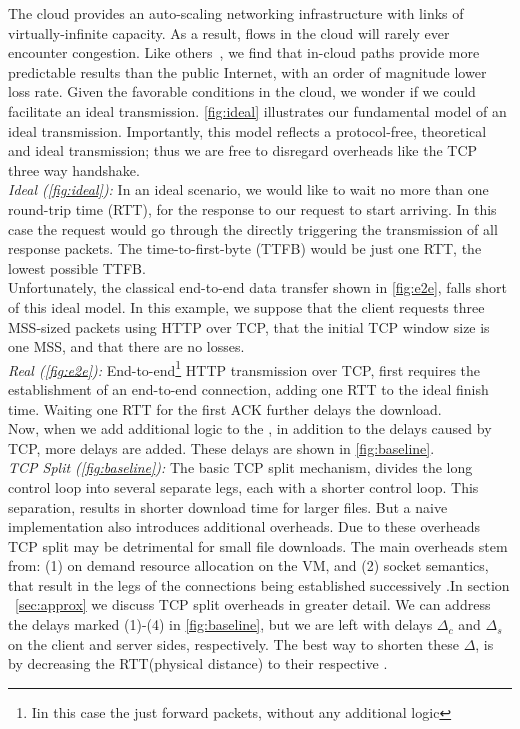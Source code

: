 The cloud provides an auto-scaling networking infrastructure with links of virtually-infinite capacity. As a result, flows in the cloud will rarely ever encounter congestion. Like others~\cite{haq2017measuring}, we find that in-cloud paths provide more predictable results than the public Internet, with an order of magnitude lower loss rate. Given the favorable conditions in the cloud, we wonder if we could facilitate an ideal transmission. \autoref{fig:ideal} illustrates our fundamental model of an ideal transmission. Importantly, this model reflects a protocol-free, theoretical and ideal transmission; thus we are free to disregard overheads like the TCP three way handshake.\\
 \textit{Ideal (\autoref{fig:ideal}):} In an ideal scenario, we would like to wait no more than one round-trip time (RTT), for the response to our request to start arriving. In this case the request would go through the \relays directly triggering the transmission of all response packets. The time-to-first-byte (TTFB) would be just one RTT, the lowest possible TTFB.\\
Unfortunately, the classical end-to-end data transfer shown in \autoref{fig:e2e}, falls short of this ideal model. In this example, we suppose that the client requests three MSS-sized packets using HTTP over TCP, that the initial TCP window size is one MSS, and that there are no losses.\\
 \textit{Real (\autoref{fig:e2e}):} End-to-end\footnote{Iin this case the \relays just forward packets, without any additional logic} HTTP transmission over TCP, first requires the establishment of an end-to-end connection, adding one RTT to the ideal finish time. Waiting one RTT for the first ACK further delays the download.\\
Now, when we add additional logic to the \relays, in addition to the delays caused by TCP, more delays are added. These delays are shown in \autoref{fig:baseline}.\\
\textit{TCP Split (\autoref{fig:baseline}): } The basic TCP split mechanism, divides the long control loop into several separate legs, each with a shorter control loop. This separation, results in shorter download time for larger files. But a naive implementation also introduces additional overheads. Due to these overheads TCP split may be detrimental for small file downloads. The main overheads stem from: (1) on demand resource allocation on the VM, and (2) socket semantics, that result in the legs of the connections being established successively .In section ~\ref{sec:approx} we discuss TCP split overheads in greater detail.  We can address the delays marked (1)-(4) in \autoref{fig:baseline}, but we are left with delays $\Delta_c$ and $\Delta_s$ on the client and server sides, respectively. The best way to shorten these $\Delta$, is by decreasing the RTT(\ie physical distance) to their respective \relays. 

